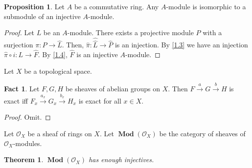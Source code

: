 \documentclass{amsart}
\numberwithin{equation}{section}
\theoremstyle{plain}
\newtheorem{thm}[equation]{Theorem}
\theoremstyle{definition}
\newtheorem{prop}[equation]{Proposition}
\newtheorem{fact}[equation]{Fact}
\DeclareMathOperator{\Mod}{\mathbf{Mod}}
\DeclareMathOperator{\im}{Im}
\begin{document}
\begin{prop}\label{1.5}
	Let $ A $ be a commutative ring. 
	Any $ A $-module is isomorphic to a submodule of an injective $ A $-module. 
\end{prop}

\begin{proof}
	Let $ L $ be an $ A $-module. 
	There exists a projective module $ P $ with a surjection $ \pi:P\to \widehat{L} $. 
	Then, $ \widehat{\pi}: \widehat{\widehat{L}}\to \widehat{P}$ is an injection. 
	By \cref{1.3} we have an injection $ \widehat{\pi}\circ i:L\to \widehat{F} $. 
	By \cref{1.4}, $ \widehat{F} $ is an injective $ A $-module. 
\end{proof}

Let $ X $ be a topological space. 

\begin{fact}\label{1.6}
	Let $ F,G,H $ be sheaves of abelian groups on $ X $. 
	Then $ F\xrightarrow{a} G\xrightarrow{b} H$
	is exact iff 
	$ F_x\xrightarrow{a_x} G_x\xrightarrow{b_x} H_x$
	is exact for all $ x\in X $. 
\end{fact}

\begin{proof}
	Omit. 
\end{proof}
%
%	
%	
%	

Let $ \mathcal{O}_X $ be a sheaf of rings on $ X $. 
Let $ \Mod(\mathcal{O}_X) $ be the category of sheaves of $ \mathcal{O}_X $-modules. 

\begin{thm}\label{1.7}
	$ \Mod(\mathcal{O}_X) $ has enough injectives.
\end{thm}
\end{document}
